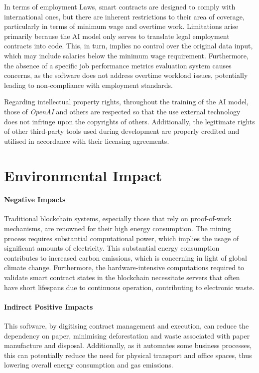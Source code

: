 In terms of employment Laws, smart contracts are designed to comply with international ones, but there are inherent restrictions to their area of coverage, particularly in terms of minimum wage and overtime work. Limitations arise primarily because the AI model only serves to translate legal employment contracts into code. This, in turn, implies no control over the original data input, which may include salaries below the minimum wage requirement. Furthermore, the absence of a specific job performance metrics evaluation system causes concerns, as the software does not address overtime workload issues, potentially leading to non-compliance with employment standards.
    
Regarding intellectual property rights, throughout the training of the AI model, those of \textit{OpenAI} and others are respected so that the use external technology does not infringe upon the copyrights of others. Additionally, the legitimate rights of other third-party tools used during development are properly credited and utilised in accordance with their licensing agreements.

\section{Environmental Impact}

\paragraph{Negative Impacts}

Traditional blockchain systems, especially those that rely on proof-of-work mechanisms, are renowned for their high energy consumption. The mining process requires substantial computational power, which implies the usage of significant amounts of electricity. This substantial energy consumption contributes to increased carbon emissions, which is concerning in light of global climate change. Furthermore, the hardware-intensive computations required to validate smart contract states in the blockchain necessitate servers that often have short lifespans due to continuous operation, contributing to electronic waste.

\paragraph{Indirect Positive Impacts}

This software, by digitising contract management and execution, can reduce the dependency on paper, minimising deforestation and waste associated with paper manufacture and disposal. Additionally, as it automates some business processes, this can potentially reduce the need for physical transport and office spaces, thus lowering overall energy consumption and gas emissions.


